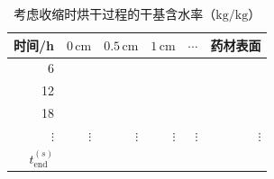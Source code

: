 \begin{table}[H]
  \centering
  \caption{考虑收缩时烘干过程的干基含水率（$\mathrm{kg/kg}$）}
  \label{tab:q4-moisture}
  \begin{tabular}{rrrrrr}
    \toprule
    时间/h & $0\,\mathrm{cm}$ & $0.5\,\mathrm{cm}$ & $1\,\mathrm{cm}$ & $\cdots$ & 药材表面 \\
    \midrule
    6  & \resultblank{--} & \resultblank{--} & \resultblank{--} & \resultblank{--} & \resultblank{--} \\
    12 & \resultblank{--} & \resultblank{--} & \resultblank{--} & \resultblank{--} & \resultblank{--} \\
    18 & \resultblank{--} & \resultblank{--} & \resultblank{--} & \resultblank{--} & \resultblank{--} \\
    $\vdots$ & $\vdots$ & $\vdots$ & $\vdots$ & $\vdots$ & $\vdots$ \\
    $t_{\mathrm{end}}^{(s)}$ & \resultblank{--} & \resultblank{--} & \resultblank{--} & \resultblank{--} & \resultblank{--} \\
    \bottomrule
  \end{tabular}
\end{table}
